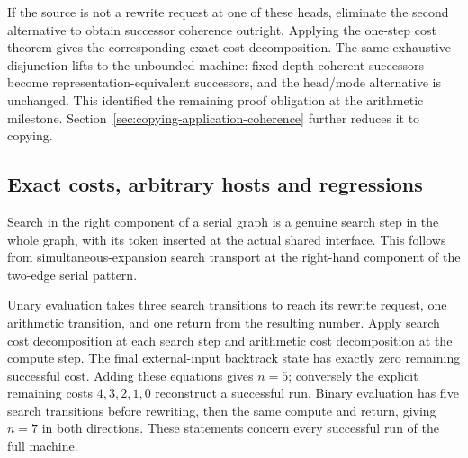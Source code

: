 

If the source is not a rewrite request at one of these heads, eliminate
the second alternative to obtain successor coherence outright. Applying the
one-step cost theorem gives the corresponding exact cost decomposition. The
same exhaustive disjunction lifts to the unbounded machine: fixed-depth coherent
successors become representation-equivalent successors, and the head/mode
alternative is unchanged. This identified the remaining proof obligation at the arithmetic milestone.
Section~\ref{sec:copying-application-coherence} further reduces it to copying.




\subsection{Exact costs, arbitrary hosts and regressions}

Search in the right component of a serial graph is a genuine search step
in the whole graph, with its token inserted at the actual shared interface.
This follows from simultaneous-expansion search transport at the right-hand
component of the two-edge serial pattern.


Unary evaluation takes three search transitions to reach its rewrite
request, one arithmetic transition, and one return from the resulting number.
Apply search cost decomposition at each search step and arithmetic cost
decomposition at the compute step. The final external-input backtrack state
has exactly zero remaining successful cost. Adding these equations gives
$n=5$; conversely the explicit remaining costs $4,3,2,1,0$ reconstruct a
successful run. Binary evaluation has five search transitions before rewriting,
then the same compute and return, giving $n=7$ in both directions. These
statements concern every successful run of the full machine.

